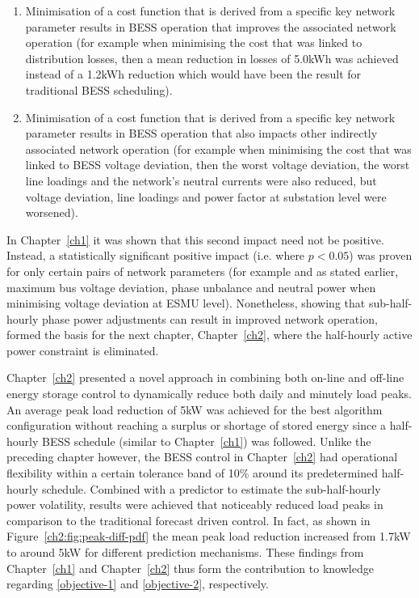 \begin{enumerate}
	\item Minimisation of a cost function that is derived from a specific key network parameter results in BESS operation that improves the associated network operation (for example when minimising the cost that was linked to distribution losses, then a mean reduction in losses of 5.0kWh was achieved instead of a 1.2kWh reduction which would have been the result for traditional BESS scheduling).
	\item Minimisation of a cost function that is derived from a specific key network parameter results in BESS operation that also impacts other indirectly associated network operation (for example when minimising the cost that was linked to BESS voltage deviation, then the worst voltage deviation, the worst line loadings and the network's neutral currents were also reduced, but voltage deviation, line loadings and power factor at substation level were worsened).
\end{enumerate}

In Chapter~\ref{ch1} it was shown that this second impact need not be positive.
Instead, a statistically significant positive impact (i.e. where $p<0.05$) was proven for only certain pairs of network parameters (for example and as stated earlier, maximum bus voltage deviation, phase unbalance and neutral power when minimising voltage deviation at ESMU level).
Nonetheless, showing that sub-half-hourly phase power adjustments can result in improved network operation, formed the basis for the next chapter, Chapter~\ref{ch2}, where the half-hourly active power constraint is eliminated.

Chapter~\ref{ch2} presented a novel approach in combining both on-line and off-line energy storage control to dynamically reduce both daily and minutely load peaks.
An average peak load reduction of 5kW was achieved for the best algorithm configuration without reaching a surplus or shortage of stored energy since a half-hourly BESS schedule (similar to Chapter~\ref{ch1}) was followed.
Unlike the preceding chapter however, the BESS control in Chapter~\ref{ch2} had operational flexibility within a certain tolerance band of 10\% around its predetermined half-hourly schedule.
Combined with a predictor to estimate the sub-half-hourly power volatility, results were achieved that noticeably reduced load peaks in comparison to the traditional forecast driven control.
In fact, as shown in Figure~\ref{ch2:fig:peak-diff-pdf} the mean peak load reduction increased from 1.7kW to around 5kW for different prediction mechanisms.
These findings from Chapter~\ref{ch1} and Chapter~\ref{ch2} thus form the contribution to knowledge regarding \ref{objective-1} and \ref{objective-2}, respectively.

